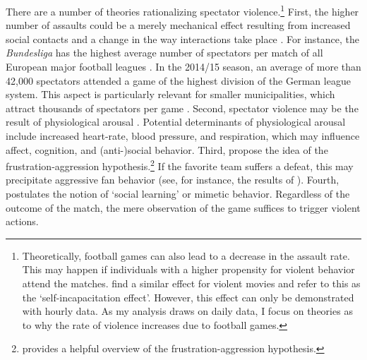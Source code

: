 There are a number of theories rationalizing spectator violence.\footnote{Theoretically, football games can also lead to a decrease in the assault rate. This may happen if individuals with a higher propensity for violent behavior attend the matches. \cite{dahl2009movie} find a similar effect for violent movies and refer to this as the `self-incapacitation effect'. However, this effect can only be demonstrated with hourly data. As my analysis draws on daily data, I focus on theories as to why the rate of violence increases due to football games.} First, the higher number of assaults could be a merely mechanical effect resulting from increased social contacts and a change in the way interactions take place \citep{montolio2019measuring}. For instance, the \textit{Bundesliga} has the highest average number of spectators per match of all European major football leagues \citep{wicker2017effect}. In the 2014/15 season, an average of more than 42,000 spectators attended a game of the highest division of the German league system. This aspect is particularly relevant for smaller municipalities, which attract thousands of spectators per game \citep{lindo2018college}. Second, spectator violence may be the result of physiological arousal \citep{branscombe1992role}. Potential determinants of physiological arousal include increased heart-rate, blood pressure, and respiration, which may influence affect, cognition, and (anti-)social behavior. Third, \cite{dollard1939frustration} propose the idea of the frustration-aggression hypothesis.\footnote{\cite{berkowitz1989frustration} provides a helpful overview of the frustration-aggression hypothesis.} If the favorite team suffers a defeat, this may precipitate aggressive fan behavior (see, for instance, the results of \cite{card2011family}). Fourth, \cite{bandura1973aggression, bandura2007social} postulates the notion of `social learning' or mimetic behavior. Regardless of the outcome of the match, the mere observation of the game suffices to trigger violent actions.



